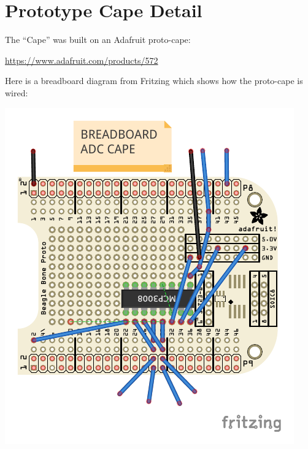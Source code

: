 \chapter{Prototype Cape Detail}


The ``Cape'' was built on an Adafruit proto-cape:

\url{https://www.adafruit.com/products/572}

Here is a breadboard diagram from Fritzing which shows how the proto-cape
is wired:

\includegraphics{../../pcb/adafruit_proto_cape_bb}

